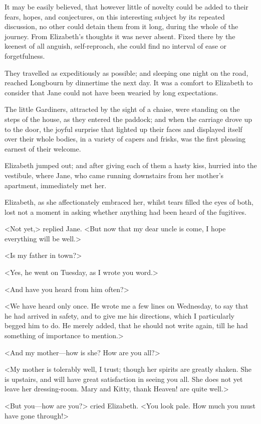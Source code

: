 It may be easily believed, that however little of novelty could be added to their fears, hopes, and conjectures, on this interesting subject by its repeated discussion, no other could detain them from it long, during the whole of the journey. From Elizabeth's thoughts it was never absent. Fixed there by the keenest of all anguish, self-reproach, she could find no interval of ease or forgetfulness.

They travelled as expeditiously as possible; and sleeping one night on the road, reached Longbourn by dinnertime the next day. It was a comfort to Elizabeth to consider that Jane could not have been wearied by long expectations.

The little Gardiners, attracted by the sight of a chaise, were standing on the steps of the house, as they entered the paddock; and when the carriage drove up to the door, the joyful surprise that lighted up their faces and displayed itself over their whole bodies, in a variety of capers and frisks, was the first pleasing earnest of their welcome.

Elizabeth jumped out; and after giving each of them a hasty kiss, hurried into the vestibule, where Jane, who came running downstairs from her mother's apartment, immediately met her.

Elizabeth, as she affectionately embraced her, whilst tears filled the eyes of both, lost not a moment in asking whether anything had been heard of the fugitives.

<Not yet,> replied Jane. <But now that my dear uncle is come, I hope everything will be well.>

<Is my father in town?>

<Yes, he went on Tuesday, as I wrote you word.>

<And have you heard from him often?>

<We have heard only once. He wrote me a few lines on Wednesday, to say that he had arrived in safety, and to give me his directions, which I particularly begged him to do. He merely added, that he should not write again, till he had something of importance to mention.>

<And my mother—how is she? How are you all?>

<My mother is tolerably well, I trust; though her spirits are greatly shaken. She is upstairs, and will have great satisfaction in seeing you all. She does not yet leave her dressing-room. Mary and Kitty, thank Heaven! are quite well.>

<But you—how are you?> cried Elizabeth. <You look pale. How much you must have gone through!>

